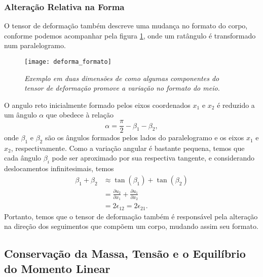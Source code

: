 \subsubsection{Altera\c{c}\~ao Relativa na Forma}

O tensor de deforma\c{c}\~ao tamb\'em descreve uma mudan\c{c}a no formato do corpo, conforme podemos acompanhar pela figura \ref{fig.deforma_formato}, onde um rat\^angulo \'e transformado num paralelogramo. 
\begin{figure}
\centering
\texttt{[image: deforma\_formato]}
\caption{\textit{Exemplo em duas dimens\~oes de como algumas componentes do tensor de deforma\c{c}\~ao promove a varia\c{c}\~ao no formato do meio.}}
\label{fig.deforma_formato}
\end{figure}
O angulo reto inicialmente formado pelos eixos coordenados $x_1$ e $x_2$ \'e reduzido a um \^angulo $\alpha$ que obedece \`a rela\c{c}\~ao
\begin{equation*}
\alpha=\frac{\pi}{2}-\beta_1-\beta_2,
\end{equation*}
onde $\beta_1$ e $\beta_2$ s\~ao os \^angulos formados pelos lados do paralelogramo e os eixos $x_1$ e $x_2$, respectivamente. Como a varia\c{c}\~ao angular \'e bastante pequena, temos que cada \^angulo $\beta_i$ pode ser aproximado por sua respectiva tangente, e considerando deslocamentos infinitesimais, temos
\begin{align*}
\beta_1+\beta_2&\approx\tan(\beta_1)+\tan(\beta_2)\\
&=\frac{\partial u_2}{\partial x_1}+\frac{\partial u_1}{\partial x_2}\\
&=2\epsilon_{12}=2\epsilon_{21}.
\end{align*}
Portanto, temos que o tensor de deforma\c{c}\~ao tamb\'em \'e respons\'avel pela altera\c{c}\~ao na dire\c{c}\~ao dos seguimentos que comp\~oem um corpo, mudando assim seu formato.


\subsection{Conserva\c{c}\~ao da Massa, Tens\~ao e o Equil\'ibrio do Momento Linear}\label{sec.massa_tensao_momen_lin}


